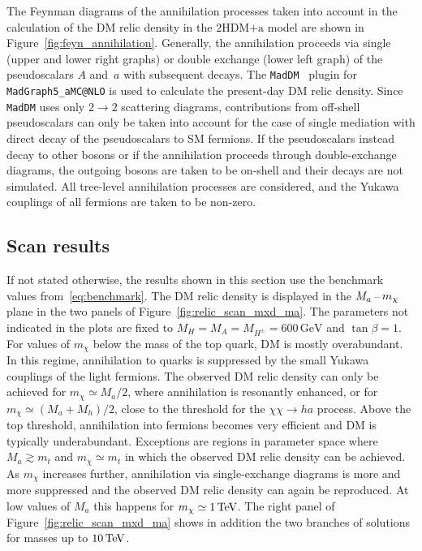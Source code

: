 \documentclass[review]{elsarticle}
\newcommand{\mA}{\ensuremath{M_{A}}\xspace}
\newcommand{\ma}{\ensuremath{M_{a}}\xspace}
\newcommand{\mH}{\ensuremath{M_{H}}\xspace}
\newcommand{\mHc}{\ensuremath{M_{H^{\pm}}}\xspace}
\newcommand{\mh}{\ensuremath{M_{h}}\xspace}
\newcommand{\hdma}{\ensuremath{\textrm{2HDM+a}}\xspace}
\begin{document}
The Feynman diagrams of the annihilation processes taken into account in the calculation of the DM relic density in the \hdma model are shown in Figure~\ref{fig:feyn_annihilation}. Generally, the annihilation proceeds via single (upper and lower right graphs) or double exchange (lower left graph) of the pseudoscalars  $A$ and~$a$ with subsequent decays. The {\tt MadDM}~\cite{Backovic:2013dpa,Backovic:2015cra} plugin for {\tt MadGraph5\_aMC@NLO} is used to calculate the present-day DM relic density.  Since {\tt MadDM} uses only $2 \to 2$ scattering diagrams, contributions from off-shell pseudoscalars can only be taken into account for the case of single mediation with direct decay of the pseudoscalars to SM fermions. If the pseudoscalars instead decay to other bosons or if the annihilation proceeds through double-exchange diagrams, the outgoing bosons are taken to be on-shell and their decays are not simulated. All tree-level annihilation processes are considered, and the Yukawa couplings of all fermions are taken to be non-zero.

\subsection{Scan results}

 If not stated otherwise, the results shown in this section use the benchmark values from~\eqref{eq:benchmark}. The DM relic density is displayed in the $\ma \hspace{0.5mm}$--$\hspace{0.5mm} m_\chi$ plane in the two panels of Figure~\ref{fig:relic_scan_mxd_ma}. The parameters not indicated in the plots are  fixed to  $\mH=\mA=\mHc= 600 \, {\mathrm{GeV}}$ and $\tan \beta=1$. For values of $m_\chi$ below the mass of the top quark, DM is mostly overabundant. In this regime, annihilation to quarks is suppressed by the small Yukawa couplings of the light fermions. The observed DM relic density can only be achieved for $m_\chi \simeq \ma/2$, where annihilation is resonantly enhanced, or for $m_\chi \simeq (\ma+\mh)/2$, close to the threshold for the $\chi\chi \to h a$ process.  Above the top threshold, annihilation into fermions becomes very efficient and DM is typically underabundant. Exceptions are regions in parameter space where $M_a \gtrsim m_t$ and $m_\chi \simeq m_t$ in which the observed DM relic density can be achieved.  As $m_\chi$ increases further, annihilation via single-exchange diagrams is more and more suppressed and the observed DM relic density can again be reproduced.  At low values of $\ma$ this happens for $m_\chi \simeq 1 \, {\rm TeV}$. The right panel of Figure~\ref{fig:relic_scan_mxd_ma}   shows in addition the two branches of solutions for masses up to $10 \, {\rm TeV}$. 
\end{document}
